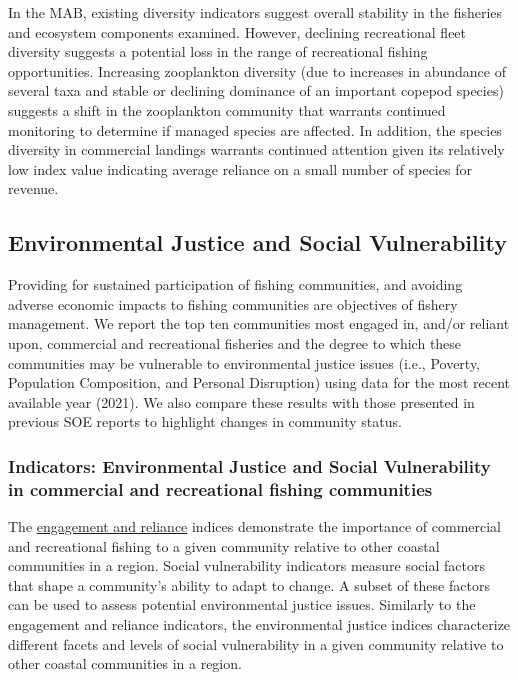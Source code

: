 \documentclass[
  10pt,
]{article}
\begin{document}
In the MAB, existing diversity indicators suggest overall stability in the fisheries and ecosystem components examined. However, declining recreational fleet diversity suggests a potential loss in the range of recreational fishing opportunities. Increasing zooplankton diversity (due to increases in abundance of several taxa and stable or declining dominance of an important copepod species) suggests a shift in the zooplankton community that warrants continued monitoring to determine if managed species are affected. In addition, the species diversity in commercial landings warrants continued attention given its relatively low index value indicating average reliance on a small number of species for revenue.

\hypertarget{environmental-justice-and-social-vulnerability}{%
\subsection{Environmental Justice and Social Vulnerability}\label{environmental-justice-and-social-vulnerability}}

Providing for sustained participation of fishing communities, and avoiding adverse economic impacts to fishing communities are objectives of fishery management. We report the top ten communities most engaged in, and/or reliant upon, commercial and recreational fisheries and the degree to which these communities may be vulnerable to environmental justice issues (i.e., Poverty, Population Composition, and Personal Disruption) using data for the most recent available year (2021). We also compare these results with those presented in previous SOE reports to highlight changes in community status.

\hypertarget{indicators-environmental-justice-and-social-vulnerability-in-commercial-and-recreational-fishing-communities}{%
\subsubsection{Indicators: Environmental Justice and Social Vulnerability in commercial and recreational fishing communities}\label{indicators-environmental-justice-and-social-vulnerability-in-commercial-and-recreational-fishing-communities}}

The \href{https://noaa-edab.github.io/catalog/engagement.html}{engagement and reliance} indices demonstrate the importance of commercial and recreational fishing to a given community relative to other coastal communities in a region. Social vulnerability indicators measure social factors that shape a community's ability to adapt to change. A subset of these factors can be used to assess potential environmental justice issues. Similarly to the engagement and reliance indicators, the environmental justice indices characterize different facets and levels of social vulnerability in a given community relative to other coastal communities in a region.
\end{document}
